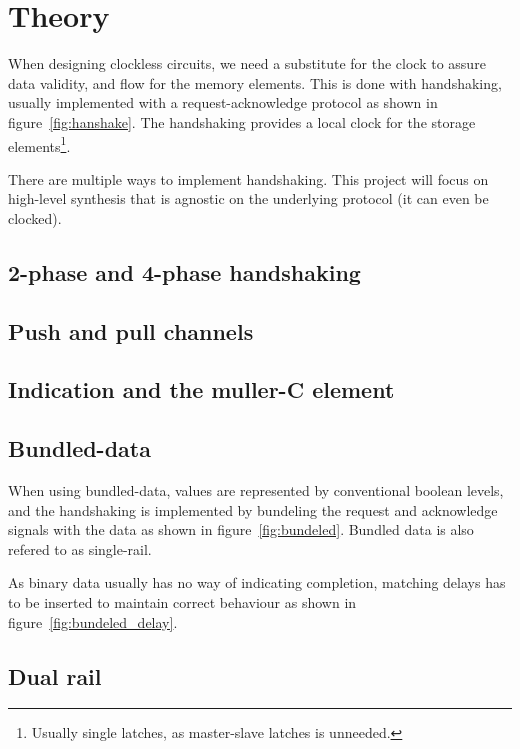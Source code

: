 \section{Theory}

When designing clockless circuits, we need a substitute for the clock
to assure data validity, and flow for the memory elements. This is
done with handshaking, usually implemented with a request-acknowledge
protocol as shown in figure~\ref{fig:hanshake}. The handshaking
provides a local clock for the storage elements\footnote{Usually
  single latches, as master-slave latches is unneeded.}.

There are multiple ways to implement handshaking. This project will
focus on high-level synthesis that is agnostic on the underlying
protocol (it can even be clocked). 

\subsection{2-phase and 4-phase handshaking}



\subsection{Push and pull channels}

\subsection{Indication and the muller-C element}

\subsection{Bundled-data}

When using bundled-data, values are represented by conventional
boolean levels, and the handshaking is implemented by bundeling the
request and acknowledge signals with the data as shown in
figure~\ref{fig:bundeled}. Bundled data is also refered to as
single-rail.

As binary data usually has no way of indicating completion, matching
delays has to be inserted to maintain correct behaviour as shown in
figure~\ref{fig:bundeled_delay}.

\subsection{Dual rail}

